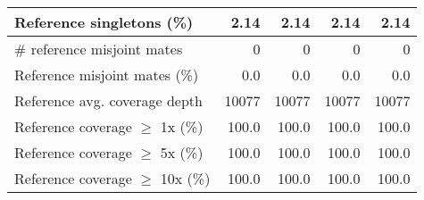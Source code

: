 \documentclass[12pt,a4paper]{article}
\begin{document}
\begin{table}[ht]
\begin{center}
\begin{tabular}{|l*{4}{|r}|}
Reference singletons (\%) & 2.14 & 2.14 & 2.14 & 2.14 \\ \hline
\# reference misjoint mates & 0 & 0 & 0 & 0 \\ \hline
Reference misjoint mates (\%) & 0.0 & 0.0 & 0.0 & 0.0 \\ \hline
Reference avg. coverage depth & 10077 & 10077 & 10077 & 10077 \\ \hline
Reference coverage $\geq$ 1x (\%) & 100.0 & 100.0 & 100.0 & 100.0 \\ \hline
Reference coverage $\geq$ 5x (\%) & 100.0 & 100.0 & 100.0 & 100.0 \\ \hline
Reference coverage $\geq$ 10x (\%) & 100.0 & 100.0 & 100.0 & 100.0 \\ \hline
\end{tabular}
\end{center}
\end{table}
\end{document}
